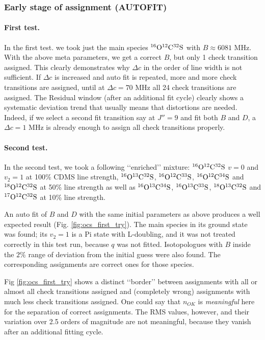 \documentclass[11pt]{article}
\begin{document}
\subsubsection{Early stage of assignment (AUTOFIT)}

\paragraph{First test.} 
In the first test. we took just the main species $\rm ^{16}O^{12}C^{32}S$ with $B \approx 6081$ MHz. With the above meta parameters, we get a correct $B$, but only 1 check transition assigned. This clearly demonstrates why $\Delta c$ in the order of line width is not sufficient. If $\Delta c$ is increased and auto fit is repeated, more and more check transitions are assigned, until at $\Delta c = 70$ MHz all 24 check transitions are assigned. The Residual window (after an additional fit cycle) clearly shows a systematic deviation trend that usually means that distortions are needed. Indeed, if we select a second fit transition say at $J'' = 9$ and fit both $B$ and $D$, a $\Delta c = 1$ MHz is already enough to assign all check transitions properly.

\paragraph{Second test.}
In the second test, we took a following \lq\lq{}enriched\rq\rq{} mixture: $\rm ^{16}O^{12}C^{32}S$ $v = 0$ and $v_2 = 1$ at 100\% CDMS line strength, 
$\rm ^{16}O^{13}C^{32}S$, $\rm ^{16}O^{12}C^{33}S$, $\rm ^{16}O^{12}C^{34}S$ and $\rm ^{18}O^{12}C^{32}S$ at 50\% line strength as well as $\rm ^{16}O^{13}C^{34}S$, $\rm ^{16}O^{13}C^{33}S$, $\rm ^{18}O^{13}C^{32}S$ and $\rm ^{17}O^{12}C^{32}S$ at 10\% line strength. 

An auto fit of $B$ and $D$ with the same initial parameters as above produces a well expected result (Fig. \ref{fig:ocs_first_try}). The main species in its ground state was found; its $v_2 = 1$ is a Pi state with L-doubling, and it was not treated correctly in this test run, because $q$ was not fitted. Isotopologues with $B$ inside the $2\%$ range of deviation from the initial guess were also found. The corresponding assignments are correct ones for those species.

Fig \ref{fig:ocs_first_try} shows a distinct \lq\lq{}border\rq\rq{} between assignments with all or almost all check transitions assigned and (completely wrong) assignments with much less check transitions assigned. One could say that $n_{OK}$ is \emph{meaningful} here for the separation of correct assignments. The RMS values, however, and their variation over 2.5 orders of magnitude are not meaningful, because they vanish after an additional fitting cycle. 
\end{document}
